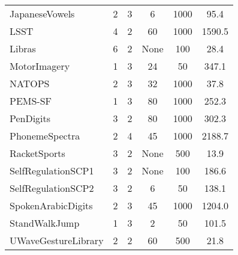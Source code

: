 \begin{tabular}{lccccc}
JapaneseVowels            &     2 &       3 &             6 &              1000 &           95.4 \\
LSST                      &     4 &       2 &            60 &              1000 &         1590.5 \\
Libras                    &     6 &       2 &          None &               100 &           28.4 \\
MotorImagery              &     1 &       3 &            24 &                50 &          347.1 \\
NATOPS                    &     2 &       3 &            32 &              1000 &           37.8 \\
PEMS-SF                   &     1 &       3 &            80 &              1000 &          252.3 \\
PenDigits                 &     3 &       2 &            80 &              1000 &          302.3 \\
PhonemeSpectra            &     2 &       4 &            45 &              1000 &         2188.7 \\
RacketSports              &     3 &       2 &          None &               500 &           13.9 \\
SelfRegulationSCP1        &     3 &       2 &          None &               100 &          186.6 \\
SelfRegulationSCP2        &     3 &       2 &             6 &                50 &          138.1 \\
SpokenArabicDigits        &     2 &       3 &            45 &              1000 &         1204.0 \\
StandWalkJump             &     1 &       3 &             2 &                50 &          101.5 \\
UWaveGestureLibrary       &     2 &       2 &            60 &               500 &           21.8 \\
\bottomrule
\end{tabular}
